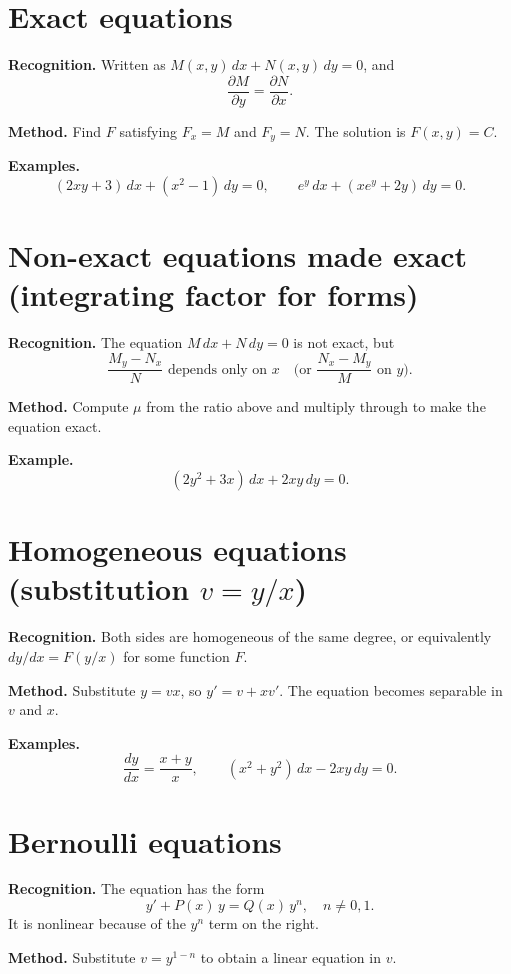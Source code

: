 \documentclass{essay}
\begin{document}
\section{Exact equations}

\textbf{Recognition.}  Written as $M(x,y)\,dx + N(x,y)\,dy = 0$, and
\[
  \frac{\partial M}{\partial y} = \frac{\partial N}{\partial x}.
\]

\textbf{Method.}  Find $F$ satisfying $F_x = M$ and $F_y = N$.  The solution is $F(x,y) = C$.

\textbf{Examples.}
\[
  (2xy + 3)\,dx + (x^2 - 1)\,dy = 0, \qquad
  e^y\,dx + (xe^y + 2y)\,dy = 0.
\]

\section{Non-exact equations made exact (integrating factor for forms)}

\textbf{Recognition.}  The equation $M\,dx + N\,dy = 0$ is not exact, but
\[
  \frac{M_y - N_x}{N} \text{ depends only on } x
  \quad \text{(or } \frac{N_x - M_y}{M} \text{ on } y \text{)}.
\]

\textbf{Method.}  Compute $\mu$ from the ratio above and multiply through to make the equation exact.

\textbf{Example.}
\[
  (2y^2 + 3x)\,dx + 2xy\,dy = 0.
\]

\section{Homogeneous equations (substitution $v = y/x$)}

\textbf{Recognition.}  Both sides are homogeneous of the same degree, or equivalently
$dy/dx = F(y/x)$ for some function $F$.

\textbf{Method.}  Substitute $y = vx$, so $y' = v + xv'$.  The equation becomes separable in $v$ and $x$.

\textbf{Examples.}
\[
  \frac{dy}{dx} = \frac{x+y}{x}, \qquad
  (x^2 + y^2)\,dx - 2xy\,dy = 0.
\]

\section{Bernoulli equations}

\textbf{Recognition.}  The equation has the form
\[
  y' + P(x)\,y = Q(x)\,y^n, \quad n \neq 0, 1.
\]
It is nonlinear because of the $y^n$ term on the right.

\textbf{Method.}  Substitute $v = y^{1-n}$ to obtain a linear equation in $v$.
\end{document}
